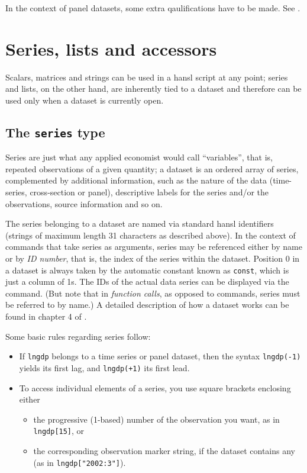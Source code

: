 In the context of panel datasets, some extra qaulifications have to be
made. See \GUG.

\chapter{Series, lists and accessors}

Scalars, matrices and strings can be used in a hansl script at any
point; series and lists, on the other hand, are inherently tied to a
dataset and therefore can be used only when a dataset is currently
open.

\section{The \texttt{series} type}
\label{sec:series}
 
Series are just what any applied economist would call ``variables'',
that is, repeated observations of a given quantity; a dataset is an
ordered array of series, complemented by additional information,
such as the nature of the data (time-series, cross-section or panel),
descriptive labels for the series and/or the observations, source
information and so on.

The series belonging to a dataset are named via standard hansl
identifiers (strings of maximum length 31 characters as described
above). In the context of commands that take series as arguments,
series may be referenced either by name or by \emph{ID number}, that
is, the index of the series within the dataset. Position 0 in a
dataset is always taken by the automatic constant known as
\texttt{const}, which is just a column of 1s. The IDs of the actual
data series can be displayed via the  command. (But note
that in \textit{function calls}, as opposed to commands, series must
be referred to by name.)  A detailed description of how a dataset
works can be found in chapter 4 of \GUG.

Some basic rules regarding series follow:
\begin{itemize}
\item If \texttt{lngdp} belongs to a time series or panel dataset,
  then the syntax \texttt{lngdp(-1)} yields its first lag, and
  \texttt{lngdp(+1)} its first lead.
\item To access individual elements of a series, you use square
  brackets enclosing either
  \begin{itemize}
  \item the progressive (1-based) number of the observation you want,
    as in \verb|lngdp[15]|, or
  \item the corresponding observation marker string, if the dataset
    contains any (as in \verb|lngdp["2002:3"]|).
  \end{itemize}
\end{itemize}


